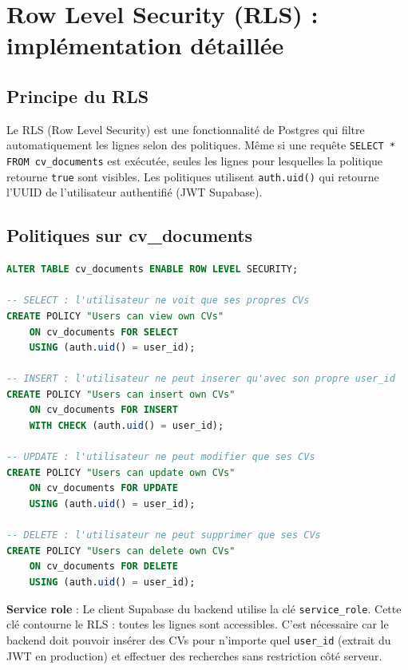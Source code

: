 \documentclass[11pt,a4paper]{report}
\begin{document}
\section{Row Level Security (RLS) : implémentation détaillée}

\subsection{Principe du RLS}

Le RLS (Row Level Security) est une fonctionnalité de Postgres qui filtre automatiquement les lignes selon des politiques. Même si une requête \texttt{SELECT * FROM cv\_documents} est exécutée, seules les lignes pour lesquelles la politique retourne \texttt{true} sont visibles. Les politiques utilisent \texttt{auth.uid()} qui retourne l'UUID de l'utilisateur authentifié (JWT Supabase).

\subsection{Politiques sur cv\_documents}

\begin{lstlisting}[caption={Politiques RLS cv_documents}, language=SQL]
ALTER TABLE cv_documents ENABLE ROW LEVEL SECURITY;

-- SELECT : l'utilisateur ne voit que ses propres CVs
CREATE POLICY "Users can view own CVs"
    ON cv_documents FOR SELECT
    USING (auth.uid() = user_id);

-- INSERT : l'utilisateur ne peut inserer qu'avec son propre user_id
CREATE POLICY "Users can insert own CVs"
    ON cv_documents FOR INSERT
    WITH CHECK (auth.uid() = user_id);

-- UPDATE : l'utilisateur ne peut modifier que ses CVs
CREATE POLICY "Users can update own CVs"
    ON cv_documents FOR UPDATE
    USING (auth.uid() = user_id);

-- DELETE : l'utilisateur ne peut supprimer que ses CVs
CREATE POLICY "Users can delete own CVs"
    ON cv_documents FOR DELETE
    USING (auth.uid() = user_id);
\end{lstlisting}

\textbf{Service role} : Le client Supabase du backend utilise la clé \texttt{service\_role}. Cette clé contourne le RLS : toutes les lignes sont accessibles. C'est nécessaire car le backend doit pouvoir insérer des CVs pour n'importe quel \texttt{user\_id} (extrait du JWT en production) et effectuer des recherches sans restriction côté serveur.
\end{document}
